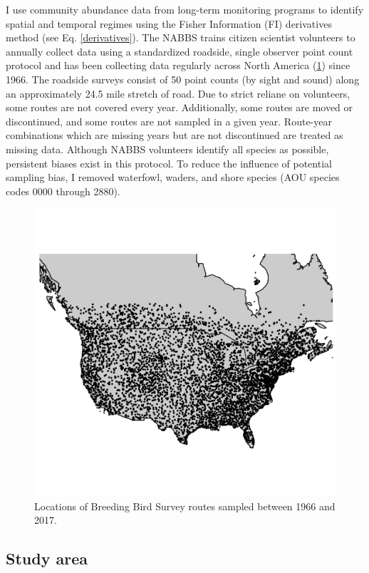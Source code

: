 \documentclass[12pt,twoside,openany]{reedthesis}
\begin{document}
I use community abundance data from long-term monitoring programs to identify spatial and temporal regimes using the Fisher Information (FI) derivatives method (see Eq. \ref{derivatives}). The NABBS trains citizen scientist volunteers to annually collect data using a standardized roadside, single observer point count protocol and has been collecting data regularly across North America (\ref{fig:bbsPoints}) since 1966. The roadside surveys consist of 50 point counts (by sight and sound) along an approximately 24.5 mile stretch of road. Due to strict reliane on volunteers, some routes are not covered every year. Additionally, some routes are moved or discontinued, and some routes are not sampled in a given year. Route-year combinations which are missing years but are not discontinued are treated as missing data. Although NABBS volunteers identify all species as possible, persistent biases exist in this protocol. To reduce the influence of potential sampling bias, I removed waterfowl, waders, and shore species (AOU species codes 0000 through 2880).
\begin{figure}[h]

{\centering \includegraphics[width=0.85\linewidth]{./chapterFiles/fisherSpatial/figures/figsCalledInDiss/bbsRoutesUsed} 

}

\caption{Locations of Breeding Bird Survey routes sampled between 1966 and 2017.}\label{fig:bbsPoints}
\end{figure}
\hypertarget{study-area}{%
\subsection{Study area}\label{study-area}}
\end{document}
